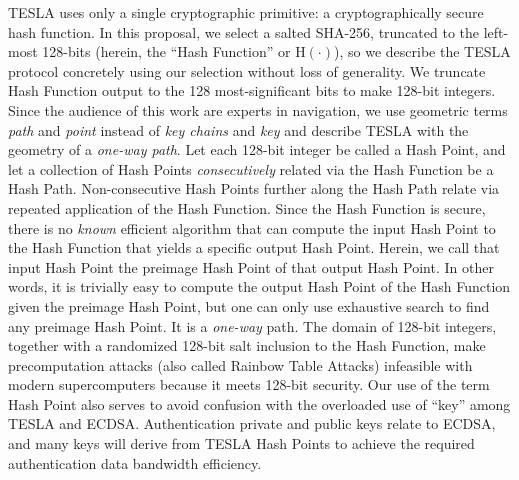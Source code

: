 \documentclass[APA,STIX1COL]{IONjournal/ION-APA Template}
\begin{document}
		TESLA uses only a single cryptographic primitive: a cryptographically secure hash function.
		In this proposal, we select a salted SHA-256, truncated to the left-most 128-bits (herein, the ``Hash Function'' or $\textrm{H}(\cdot)$), so we describe the TESLA protocol concretely using our selection without loss of generality.
		We truncate Hash Function output to the 128 most-significant bits to make 128-bit integers.
		Since the audience of this work are experts in navigation, we use geometric terms {\em path} and {\em point} instead of {\em key chains} and {\em key} and describe TESLA with the geometry of a {\em one-way path}.
		Let each 128-bit integer be called a Hash Point, and let a collection of Hash Points {\em consecutively} related via the Hash Function be a Hash Path.
		Non-consecutive Hash Points further along the Hash Path relate via repeated application of the Hash Function.
		Since the Hash Function is secure, there is no {\em known} efficient algorithm that can compute the input Hash Point to the Hash Function that yields a specific output Hash Point.
		Herein, we call that input Hash Point the preimage Hash Point of that output Hash Point.
		In other words, it is trivially easy to compute the output Hash Point of the Hash Function given the preimage Hash Point, but one can only use exhaustive search to find any preimage Hash Point.
		It is a {\em one-way} path.
		The domain of 128-bit integers, together with a randomized 128-bit salt inclusion to the Hash Function, make precomputation attacks (also called Rainbow Table Attacks) infeasible with modern supercomputers because it meets 128-bit security.
		Our use of the term Hash Point also serves to avoid confusion with the overloaded use of ``key'' among TESLA and ECDSA.
		Authentication private and public keys relate to ECDSA, and many keys will derive from TESLA Hash Points to achieve the required authentication data bandwidth efficiency.
\end{document}
